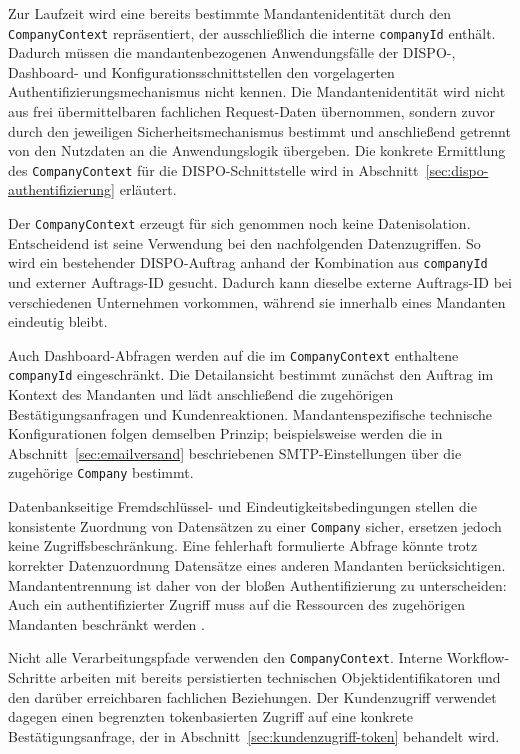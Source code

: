 \documentclass[
  12pt,
  a4paper,
  oneside
]{article}
\begin{document}
Zur Laufzeit wird eine bereits bestimmte Mandantenidentität durch den
\texttt{CompanyContext} repräsentiert, der ausschließlich die interne
\texttt{companyId} enthält. Dadurch müssen die mandantenbezogenen
Anwendungsfälle der DISPO-, Dashboard- und Konfigurationsschnittstellen den
vorgelagerten Authentifizierungsmechanismus nicht kennen. Die
Mandantenidentität wird nicht aus frei übermittelbaren fachlichen Request-Daten
übernommen, sondern zuvor durch den jeweiligen Sicherheitsmechanismus bestimmt
und anschließend getrennt von den Nutzdaten an die Anwendungslogik übergeben.
Die konkrete Ermittlung des \texttt{CompanyContext} für die DISPO-Schnittstelle
wird in Abschnitt~\ref{sec:dispo-authentifizierung} erläutert.

Der \texttt{CompanyContext} erzeugt für sich genommen noch keine
Datenisolation. Entscheidend ist seine Verwendung bei den nachfolgenden
Datenzugriffen. So wird ein bestehender DISPO-Auftrag anhand der Kombination aus
\texttt{companyId} und externer Auftrags-ID gesucht. Dadurch kann dieselbe
externe Auftrags-ID bei verschiedenen Unternehmen vorkommen, während sie
innerhalb eines Mandanten eindeutig bleibt.

Auch Dashboard-Abfragen werden auf die im \texttt{CompanyContext} enthaltene
\texttt{companyId} eingeschränkt. Die Detailansicht bestimmt zunächst den
Auftrag im Kontext des Mandanten und lädt anschließend die zugehörigen
Bestätigungsanfragen und Kundenreaktionen. Mandantenspezifische technische
Konfigurationen folgen demselben Prinzip; beispielsweise werden die in
Abschnitt~\ref{sec:emailversand} beschriebenen SMTP-Einstellungen über die
zugehörige \texttt{Company} bestimmt.

Datenbankseitige Fremdschlüssel- und Eindeutigkeitsbedingungen stellen die
konsistente Zuordnung von Datensätzen zu einer \texttt{Company} sicher,
ersetzen jedoch keine Zugriffsbeschränkung. Eine fehlerhaft formulierte Abfrage
könnte trotz korrekter Datenzuordnung Datensätze eines anderen Mandanten
berücksichtigen. Mandantentrennung ist daher von der bloßen Authentifizierung
zu unterscheiden: Auch ein authentifizierter Zugriff muss auf die Ressourcen
des zugehörigen Mandanten beschränkt werden
\parencite{aws2022tenantIsolation}.

Nicht alle Verarbeitungspfade verwenden den \texttt{CompanyContext}. Interne
Workflow-Schritte arbeiten mit bereits persistierten technischen
Objektidentifikatoren und den darüber erreichbaren fachlichen Beziehungen. Der
Kundenzugriff verwendet dagegen einen begrenzten tokenbasierten Zugriff auf
eine konkrete Bestätigungsanfrage, der in
Abschnitt~\ref{sec:kundenzugriff-token} behandelt wird.
\end{document}
